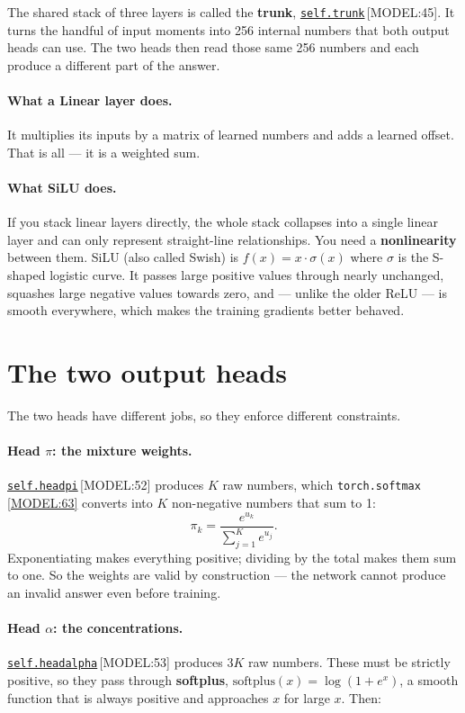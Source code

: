 \documentclass[11pt,a4paper]{report}
\newcommand{\srcbase}{vscode://file/Users/syellapa/Documents/Research/2026/ANSYS/Multi-ScalarPDF}
\newcommand{\dmdn}{dirichlet\string_mdn}
\newcommand{\srctag}[1]{{\footnotesize\textcolor{TagGray}{[#1]}}}
\newcommand{\Model}[2]{\href{\srcbase/\dmdn/model.py:#1}{\texttt{#2}}\,\srctag{MODEL:#1}}
\newcommand{\ModelL}[1]{\href{\srcbase/\dmdn/model.py:#1}{\srctag{MODEL:#1}}}
\newcommand{\code}[1]{\texttt{#1}}
\newcommand{\term}[1]{\textbf{#1}}
\renewcommand{\_}{\origtextunderscore\allowbreak}
\begin{document}
The shared stack of three layers is called the \term{trunk}, \Model{45}{self.trunk}. It turns
the handful of input moments into 256 internal numbers that both output heads can use. The two
heads then read those same 256 numbers and each produce a different part of the answer.

\paragraph{What a \term{Linear} layer does.} It multiplies its inputs by a matrix of learned
numbers and adds a learned offset. That is all --- it is a weighted sum.

\paragraph{What \term{SiLU} does.} If you stack linear layers directly, the whole stack
collapses into a single linear layer and can only represent straight-line relationships. You
need a \term{nonlinearity} between them. SiLU (also called Swish) is
$f(x) = x \cdot \sigma(x)$ where $\sigma$ is the S-shaped logistic curve. It passes large
positive values through nearly unchanged, squashes large negative values towards zero, and ---
unlike the older ReLU --- is smooth everywhere, which makes the training gradients better
behaved.

\section{The two output heads}

The two heads have different jobs, so they enforce different constraints.

\paragraph{Head $\pi$: the mixture weights.} \Model{52}{self.head\_pi} produces $K$ raw
numbers, which \code{torch.softmax} \ModelL{63} converts into $K$ non-negative numbers that sum
to 1:
\[
  \pi_k = \frac{e^{u_k}}{\sum_{j=1}^{K} e^{u_j}} .
\]
Exponentiating makes everything positive; dividing by the total makes them sum to one. So the
weights are valid by construction --- the network cannot produce an invalid answer even
before training.

\paragraph{Head $\alpha$: the concentrations.} \Model{53}{self.head\_alpha} produces $3K$ raw
numbers. These must be strictly positive, so they pass through \term{softplus},
$\mathrm{softplus}(x) = \log(1 + e^x)$, a smooth function that is always positive and
approaches $x$ for large $x$. Then:
\end{document}
